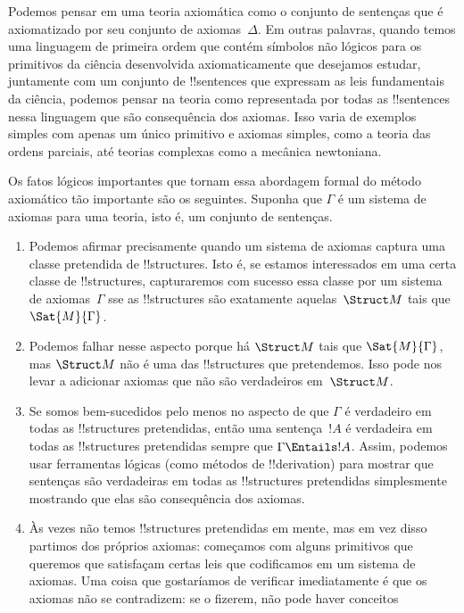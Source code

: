 \documentclass[../../../include/open-logic-section]{subfiles}
\begin{document}
\begin{explain}
Podemos pensar em uma teoria axiomática como o conjunto de sentenças que é
axiomatizado por seu conjunto de axiomas~$\Delta$.  Em outras palavras, quando
temos uma linguagem de primeira ordem que contém símbolos não lógicos para os
primitivos da ciência desenvolvida axiomaticamente que desejamos estudar,
juntamente com um conjunto de !!{sentence}s que expressam as leis fundamentais
da ciência, podemos pensar na teoria como representada por todas as
!!{sentence}s nessa linguagem que são consequência dos axiomas.  Isso
varia de exemplos simples com apenas um único primitivo e
axiomas simples, como a teoria das ordens parciais, até teorias complexas
como a mecânica newtoniana.

Os fatos lógicos importantes que tornam essa abordagem formal do
método axiomático tão importante são os seguintes.  Suponha que $\Gamma$ é
um sistema de axiomas para uma teoria, isto é, um conjunto de sentenças.
\begin{enumerate}
\item Podemos afirmar precisamente quando um sistema de axiomas captura uma classe
  pretendida de !!{structure}s.  Isto é, se estamos interessados em uma certa
  classe de !!{structure}s, capturaremos com sucesso essa classe por
  um sistema de axiomas~$\Gamma$ sse as !!{structure}s são exatamente
  aquelas~$\Struct M$ tais que $\Sat{M}{\Gamma}$.
\item Podemos falhar nesse aspecto porque há $\Struct M$ tais
  que $\Sat{M}{\Gamma}$, mas $\Struct M$ não é uma das
  !!{structure}s que pretendemos.  Isso pode nos levar a adicionar axiomas que
  não são verdadeiros em~$\Struct M$.
\item Se somos bem-sucedidos pelo menos no aspecto de que $\Gamma$ é
  verdadeiro em todas as !!{structure}s pretendidas, então uma sentença~$!A$ é verdadeira em
  todas as !!{structure}s pretendidas sempre que $\Gamma \Entails !A$.  Assim, podemos
  usar ferramentas lógicas (como métodos de !!{derivation}) para mostrar que sentenças são
  verdadeiras em todas as !!{structure}s pretendidas simplesmente mostrando que elas são
  consequência dos axiomas.
\item Às vezes não temos !!{structure}s pretendidas em mente, mas em vez disso
  partimos dos próprios axiomas: começamos com alguns primitivos que
  queremos que satisfaçam certas leis que codificamos em um sistema de axiomas.
  Uma coisa que gostaríamos de verificar imediatamente é que os axiomas
  não se contradizem: se o fizerem, não pode haver conceitos

\end{enumerate}
\end{explain}
\end{document}
